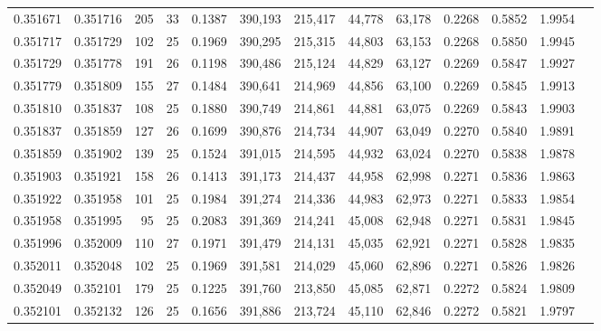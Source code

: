 \begin{tabular}{rrrrrrrrrrrrr}
0.351671 & 0.351716 &   205 &  33 &                                     0.1387 & 390,193 & 215,417 &  44,778 &  63,178 & 0.2268 & 0.5852 & 1.9954 \\
0.351717 & 0.351729 &   102 &  25 &                                     0.1969 & 390,295 & 215,315 &  44,803 &  63,153 & 0.2268 & 0.5850 & 1.9945 \\
0.351729 & 0.351778 &   191 &  26 &                                     0.1198 & 390,486 & 215,124 &  44,829 &  63,127 & 0.2269 & 0.5847 & 1.9927 \\
0.351779 & 0.351809 &   155 &  27 &                                     0.1484 & 390,641 & 214,969 &  44,856 &  63,100 & 0.2269 & 0.5845 & 1.9913 \\
0.351810 & 0.351837 &   108 &  25 &                                     0.1880 & 390,749 & 214,861 &  44,881 &  63,075 & 0.2269 & 0.5843 & 1.9903 \\
0.351837 & 0.351859 &   127 &  26 &                                     0.1699 & 390,876 & 214,734 &  44,907 &  63,049 & 0.2270 & 0.5840 & 1.9891 \\
0.351859 & 0.351902 &   139 &  25 &                                     0.1524 & 391,015 & 214,595 &  44,932 &  63,024 & 0.2270 & 0.5838 & 1.9878 \\
0.351903 & 0.351921 &   158 &  26 &                                     0.1413 & 391,173 & 214,437 &  44,958 &  62,998 & 0.2271 & 0.5836 & 1.9863 \\
0.351922 & 0.351958 &   101 &  25 &                                     0.1984 & 391,274 & 214,336 &  44,983 &  62,973 & 0.2271 & 0.5833 & 1.9854 \\
0.351958 & 0.351995 &    95 &  25 &                                     0.2083 & 391,369 & 214,241 &  45,008 &  62,948 & 0.2271 & 0.5831 & 1.9845 \\
0.351996 & 0.352009 &   110 &  27 &                                     0.1971 & 391,479 & 214,131 &  45,035 &  62,921 & 0.2271 & 0.5828 & 1.9835 \\
0.352011 & 0.352048 &   102 &  25 &                                     0.1969 & 391,581 & 214,029 &  45,060 &  62,896 & 0.2271 & 0.5826 & 1.9826 \\
0.352049 & 0.352101 &   179 &  25 &                                     0.1225 & 391,760 & 213,850 &  45,085 &  62,871 & 0.2272 & 0.5824 & 1.9809 \\
0.352101 & 0.352132 &   126 &  25 &                                     0.1656 & 391,886 & 213,724 &  45,110 &  62,846 & 0.2272 & 0.5821 & 1.9797 \\

\end{tabular}
